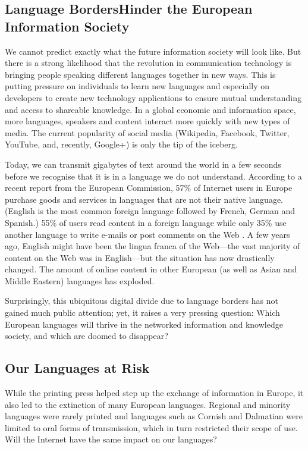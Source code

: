 \documentclass[]{../../metanetpaper}
\begin{document}
\begin{multicols}{2}
\subsection[Language Borders Hinder the European Information Society]{Language Borders\newline Hinder the European Information Society}

    We cannot predict exactly what the future information society will look like. But there is a strong likelihood that the revolution in communication technology is bringing people speaking different languages together in new ways. This is putting pressure on individuals to learn new languages and especially on developers to create new technology applications to ensure mutual understanding and access to shareable knowledge. In a global economic and information space, more languages, speakers and content interact more quickly with new types of media. The current popularity of social media (Wikipedia, Facebook, Twitter, YouTube, and, recently, Google+) is only the tip of the iceberg.

    Today, we can transmit gigabytes of text around the world in a few seconds before we recognise that it is in a language we do not understand. According to a recent report from the European Commission, 57\% of Internet users in Europe purchase goods and services in languages that are not their native language. (English is the most common foreign language followed by French, German and Spanish.) 55\% of users read content in a foreign language while only 35\% use another language to write e-mails or post comments on the Web \cite{CAT-Nota1}. A few years ago, English might have been the lingua franca of the Web—the vast majority of content on the Web was in English—but the situation has now drastically changed. The amount of online content in other European (as well as Asian and Middle Eastern) languages has exploded.

    Surprisingly, this ubiquitous digital divide due to language borders has not gained much public attention; yet, it raises a very pressing question: Which European languages will thrive in the networked information and knowledge society, and which are doomed to disappear?

\subsection{Our Languages at Risk}

    While the printing press helped step up the exchange of information in Europe, it also led to the extinction of many European languages. Regional and minority languages were rarely printed and languages such as Cornish and Dalmatian were limited to oral forms of transmission, which in turn restricted their scope of use. Will the Internet have the same impact on our languages?


\end{multicols}
\end{document}
